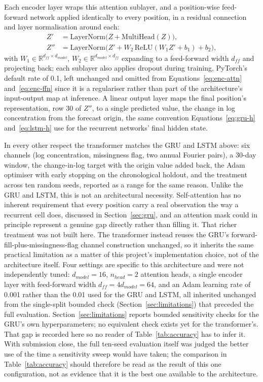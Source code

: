 \documentclass[12pt,a4paper]{report}
\begin{document}
Each encoder layer wraps this attention sublayer, and a position-wise
feed-forward network applied identically to every position, in a residual
connection and layer normalisation around each:
\begin{align}
Z' &= \mathrm{LayerNorm}\big(Z + \mathrm{MultiHead}(Z)\big), \label{eq:enc-attn}\\
Z'' &= \mathrm{LayerNorm}\big(Z' + W_2\,\mathrm{ReLU}(W_1 Z' + b_1) + b_2\big), \label{eq:enc-ffn}
\end{align}
with $W_1 \in \mathbb{R}^{d_{ff}\times d_{model}}$, $W_2 \in
\mathbb{R}^{d_{model}\times d_{ff}}$ expanding to a feed-forward width
$d_{ff}$ and projecting back; each sublayer also applies dropout during
training, PyTorch's default rate of 0.1, left unchanged and omitted from
Equations~\ref{eq:enc-attn} and~\ref{eq:enc-ffn} since it is a regulariser
rather than part of the architecture's input-output map at inference. A
linear output layer maps the final position's representation, row 30 of
$Z''$, to a single predicted value, the change in log concentration from
the forecast origin, the same convention Equations~\ref{eq:gru-h}
and~\ref{eq:lstm-h} use for the recurrent networks' final hidden state.

In every other respect the transformer matches the GRU and LSTM above: six
channels (log concentration, missingness flag, two annual Fourier pairs), a
30-day window, the change-in-log target with the origin value added back,
the Adam optimiser with early stopping on the chronological holdout, and the
treatment across ten random seeds, reported as a range for the same reason.
Unlike the GRU and LSTM, this is not an architectural necessity.
Self-attention has no inherent requirement that every position carry a real
observation the way a recurrent cell does, discussed in
Section~\ref{sec:gru}, and an attention mask could in principle represent a
genuine gap directly rather than filling it. That richer treatment was not
built here. The transformer instead reuses the GRU's
forward-fill-plus-missingness-flag channel construction unchanged, so it
inherits the same practical limitation as a matter of this project's
implementation choice, not of the architecture itself. Four settings are
specific to this architecture and were not independently tuned:
$d_{model}=16$, $n_{head}=2$ attention heads, a single encoder layer with
feed-forward width $d_{ff}=4d_{model}=64$, and an Adam learning rate of
0.001 rather than the 0.01 used for the GRU and LSTM, all inherited
unchanged from the single-split bounded check (Section~\ref{sec:limitations})
that preceded the full evaluation. Section~\ref{sec:limitations} reports
bounded sensitivity checks for the GRU's own hyperparameters; no equivalent
check exists yet for the transformer's. That gap is recorded here so no
reader of Table~\ref{tab:accuracy} has to infer it. With submission close,
the full ten-seed evaluation itself was judged the better use of the time a
sensitivity sweep would have taken; the comparison in Table~\ref{tab:accuracy}
should therefore be read as the result of this one configuration, not as
evidence that it is the best one available to the architecture.
\end{document}
